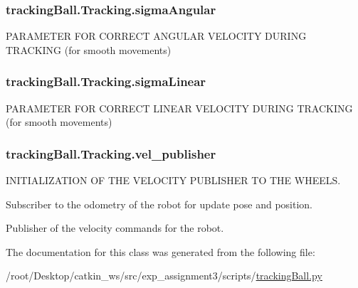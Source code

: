 \subsubsection[{\texorpdfstring{sigma\+Angular}{sigmaAngular}}]{\setlength{\rightskip}{0pt plus 5cm}tracking\+Ball.\+Tracking.\+sigma\+Angular}\hypertarget{classtrackingBall_1_1Tracking_abcf19d205ec149c4f87a2c3b43fa242e}{}\label{classtrackingBall_1_1Tracking_abcf19d205ec149c4f87a2c3b43fa242e}


P\+A\+R\+A\+M\+E\+T\+ER F\+OR C\+O\+R\+R\+E\+CT A\+N\+G\+U\+L\+AR V\+E\+L\+O\+C\+I\+TY D\+U\+R\+I\+NG T\+R\+A\+C\+K\+I\+NG (for smooth movements) 

\subsubsection[{\texorpdfstring{sigma\+Linear}{sigmaLinear}}]{\setlength{\rightskip}{0pt plus 5cm}tracking\+Ball.\+Tracking.\+sigma\+Linear}\hypertarget{classtrackingBall_1_1Tracking_a684292f4752cf04f4aeb3baf84e0b155}{}\label{classtrackingBall_1_1Tracking_a684292f4752cf04f4aeb3baf84e0b155}


P\+A\+R\+A\+M\+E\+T\+ER F\+OR C\+O\+R\+R\+E\+CT L\+I\+N\+E\+AR V\+E\+L\+O\+C\+I\+TY D\+U\+R\+I\+NG T\+R\+A\+C\+K\+I\+NG (for smooth movements) 

\subsubsection[{\texorpdfstring{vel\+\_\+publisher}{vel_publisher}}]{\setlength{\rightskip}{0pt plus 5cm}tracking\+Ball.\+Tracking.\+vel\+\_\+publisher}\hypertarget{classtrackingBall_1_1Tracking_aec612c6502c0a334f67d8b32e7b77b62}{}\label{classtrackingBall_1_1Tracking_aec612c6502c0a334f67d8b32e7b77b62}


I\+N\+I\+T\+I\+A\+L\+I\+Z\+A\+T\+I\+ON OF T\+HE V\+E\+L\+O\+C\+I\+TY P\+U\+B\+L\+I\+S\+H\+ER TO T\+HE W\+H\+E\+E\+LS. 

Subscriber to the odometry of the robot for update pose and position.

Publisher of the velocity commands for the robot. 

The documentation for this class was generated from the following file\+:\begin{DoxyCompactItemize}
\item 
/root/\+Desktop/catkin\+\_\+ws/src/exp\+\_\+assignment3/scripts/\hyperlink{trackingBall_8py}{tracking\+Ball.\+py}\end{DoxyCompactItemize}
